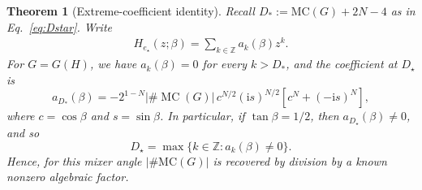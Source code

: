 \documentclass[11pt]{article}
\newtheorem{theorem}{Theorem}[section]
\newcommand{\mc}{\operatorname{MC}}
\newcommand{\M}{\#\mc}
\newcommand{\ii}{\mathrm{i}}
\begin{document}
\begin{theorem}[Extreme-coefficient identity]\label{thm:coefficient}
Recall $D_* := \mathrm{MC}(G)+2N-4$ as in Eq.~\eqref{eq:Dstar}. Write
\begin{eqnarray}
    H_{e_\star}(z;\beta)=\sum_{k\in\mathbb Z}a_k(\beta)z^k.
\end{eqnarray}
For \(G=G(H)\), we have
  $a_k(\beta)=0$ for every $k>D_*$, 
and the coefficient at \(D_\star\) is
\begin{equation}
 a_{D_*}(\beta)
 =-2^{1-N}|\M(G)|\,
 c^{N/2}(\ii s)^{N/2}\left[c^N+(-\ii s)^N\right],
 \label{eq:edge-top-coefficient}
\end{equation}
where \(c=\cos\beta\) and \(s=\sin\beta\). %
In particular, if \(\tan\beta=1/2\), then
\(a_{D_\star}(\beta)\neq0\), and so 
\[
  D_\star=\max\{k\in\mathbb Z:a_k(\beta)\neq0\}.
\]
Hence, for this mixer angle \(|\#\mathrm{MC}(G)|\) is recovered by division
by a known nonzero algebraic factor.
\end{theorem}
\end{document}
